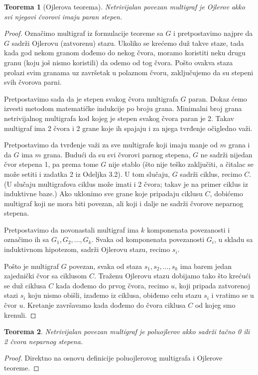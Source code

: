 \documentclass[a4paper,12pt]{article}
\numberwithin{algorithm}{section}
\theoremstyle{plain}
\newtheorem{theorem}{Teorema}[section]
\theoremstyle{definition}
\theoremstyle{remark}
\begin{document}
\begin{theorem}[Ojlerova teorema]
    Netrivijalan povezan multigraf je Ojlerov akko svi njegovi čvorovi imaju paran stepen.
\end{theorem}
\begin{proof}
    Označimo multigraf iz formulacije teoreme sa $G$ i pretpostavimo najpre da $G$ sadrži Ojlerovu (zatvorenu) stazu. Ukoliko se krećemo duž takve staze, tada kada god nekom granom dođemo do nekog čvora, moramo koristiti neku drugu granu (koju još nismo koristili) da odemo od tog čvora. Pošto ovakva staza prolazi svim granama uz završetak u polaznom čvoru, zaključujemo da su stepeni svih čvorova parni.

    Pretpostavimo sada da je stepen svakog čvora multigrafa $G$ paran. Dokaz ćemo izvesti metodom matematičke indukcije po broju grana. Minimalni broj grana netrivijalnog multigrafa kod kojeg je stepen svakog čvora paran je 2. Takav multigraf ima 2 čvora i 2 grane koje ih spajaju i za njega tvrđenje očigledno važi.

    Pretpostavimo da tvrđenje važi za sve multigrafe koji imaju manje od $m$ grana i da $G$ ima $m$ grana. Budući da su svi čvorovi parnog stepena, $G$ ne sadrži nijedan čvor stepena 1, pa prema tome $G$ nije stablo (što nije teško zaključiti, a čitalac se može setiti i zadatka 2 iz Odeljka 3.2). U tom slučaju, $G$ sadrži ciklus, recimo $C$. (U slučaju multigrafova ciklus može imati i 2 čvora; takav je na primer ciklus iz induktivne baze.) Ako uklonimo sve grane koje pripadaju ciklusu $C$, dobićemo multigraf koji ne mora biti povezan, ali koji i dalje ne sadrži čvorove neparnog stepena.

    Pretpostavimo da novonastali multigraf ima $k$ komponenata povezanosti i označimo ih sa $G_1, G_2, \dots, G_k$. Svaka od komponenata povezanosti $G_i$, u skladu sa induktivnom hipotezom, sadrži Ojlerovu stazu, recimo $s_i$.

    Pošto je multigraf $G$ povezan, svaka od staza $s_1, s_2, \dots, s_k$ ima barem jedan zajednički čvor sa ciklusom $C$. Traženu Ojlerovu stazu dobijamo tako što krećući se duž ciklusa $C$ kada dođemo do prvog čvora, recimo $u$, koji pripada zatvorenoj stazi $s_i$ koju nismo obišli, izađemo iz ciklusa, obiđemo celu stazu $s_i$ i vratimo se u čvor $u$. Kretanje završavamo kada dođemo do čvora ciklusa $C$ od kojeg smo krenuli.
\end{proof}

\begin{theorem}
    Netrivijalan povezan multigraf je poluojlerov akko sadrži tačno 0 ili 2 čvora neparnog stepena.
\end{theorem}
\begin{proof}
    Direktno na osnovu definicije poluojlerovog multigrafa i Ojlerove teoreme.
\end{proof}
\end{document}
